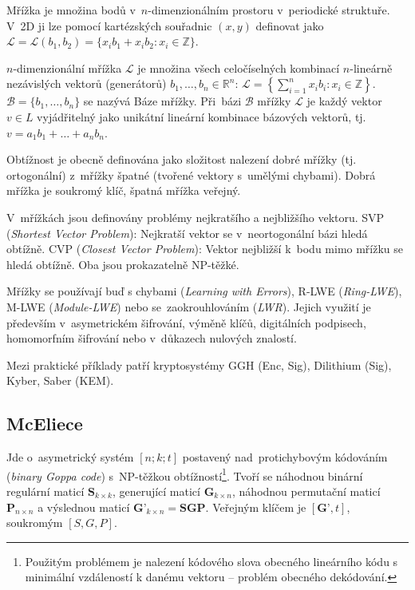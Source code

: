 Mřížka je množina bodů v~$n$-dimenzionálním prostoru v~periodické struktuře.
V~2D ji lze pomocí kartézských souřadnic $(x, y)$ definovat jako
$\mathcal{L} = \mathcal{L}(b_1, b_2) = \{x_i b_1 + x_i b_2 : x_i \in \mathbb{Z}\}$.

$n$-dimenzionální mřížka $\mathcal{L}$ je množina všech celočíselných kombinací $n$-lineárně nezávislých vektorů (generátorů) $b_1, \dots, b_n \in \mathbb{R}^n$:
$\mathcal{L} = \left\{ \sum_{i=1}^n x_i b_i : x_i \in \mathbb{Z} \right\}$.
$\mathcal{B} = \{b_1, \dots, b_n\}$ se nazývá Báze mřížky.
Při~bázi $\mathcal{B}$ mřížky $\mathcal{L}$ je každý vektor $v \in L$ vyjádřitelný jako unikátní lineární kombinace bázových vektorů, tj. $v = a_1 b_1 + \dots + a_n b_n$.

Obtížnost je obecně definována jako složitost nalezení dobré mřížky (tj. ortogonální) z~mřížky špatné (tvořené vektory s~umělými chybami).
Dobrá mřížka je soukromý klíč, špatná mřížka veřejný.

V~mřížkách jsou definovány problémy nejkratšího a nejbližšího vektoru.
SVP (\emph{Shortest Vector Problem}): Nejkratší vektor se v~neortogonální bázi hledá obtížně.
CVP (\emph{Closest Vector Problem}): Vektor nejbližší k~bodu mimo mřížku se hledá obtížně.
Oba jsou prokazatelně NP-těžké.

Mřížky se používají buď s chybami (\emph{Learning with Errors}), R-LWE (\emph{Ring-LWE}), M-LWE (\emph{Module-LWE}) nebo se~zaokrouhlováním (\emph{LWR}).
Jejich využití je především v~asymetrickém šifrování, výměně klíčů, digitálních podpisech, homomorfním šifrování nebo v~důkazech nulových znalostí.

Mezi praktické příklady patří kryptosystémy GGH (Enc, Sig), Dilithium (Sig), Kyber, Saber (KEM).


\subsection{McEliece}

Jde o~asymetrický systém $[n;k;t]$ postavený nad~protichybovým kódováním (\emph{binary Goppa code}) s~NP-těžkou obtížností\footnote{Použitým problémem je nalezení kódového slova obecného lineárního kódu s minimální vzdáleností k danému vektoru – problém obecného dekódování.}.
Tvoří se náhodnou binární regulární maticí $\textbf{S}_{k \times k}$, generující maticí $\textbf{G}_{k \times n}$, náhodnou permutační maticí $\textbf{P}_{n \times n}$ a výslednou maticí $\textbf{G'}_{k \times n} = \textbf{SGP}$.
Veřejným klíčem je $[\textbf{G'}, t]$, soukromým $[S, G, P]$.

